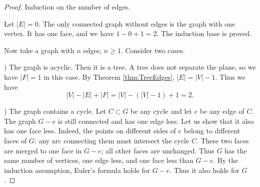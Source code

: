 

\setcounter{section}{3}
\setcounter{subsection}{2}
\setcounter{dfn}{8}


\begin{proof}
Induction on the number of edges.

Let $|E| = 0$. The only connected graph without edges is the graph with one vertex.
It has one face, and we have $1 - 0 + 1 = 2$. The induction base is proved.

Now take a graph with $n$ edges, $n \ge 1$.
Consider two cases.

) The graph is acyclic.
Then it is a tree. A tree does not separate the plane, so we have $|F| = 1$ in this case.
By Theorem \ref{thm:TreeEdges}, $|E| = |V|-1$.
Thus we have
\[
|V| - |E| + |F| = |V| - (|V|-1) + 1 = 2.
\]

) The graph contains a cycle.
Let $C \subset G$ be any cycle and let $e$ be any edge of $C$.
The graph $G - e$ is still connected and has one edge less.
Let us show that it also has one face less.
Indeed, the points on different sides of $e$ belong to different faces of $G$:
any arc connecting them must intersect the cycle $C$.
These two faces are merged to one face in $G - e$; all other faces are unchanged.
Thus $G$ has the same number of vertices, one edge less, and one face less than $G - e$.
By the induction assumption, Euler's formula holds for $G - e$.
Thus it also holds for $G$.
\end{proof}




